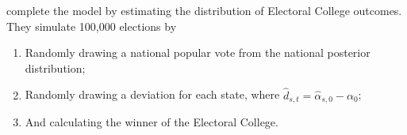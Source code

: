 \documentclass[thesis.tex]{subfiles}
\begin{document}
\begin{comment}
	TODO Should be weighted average on the Var(d_st, d_s0) stuff.
\end{comment}

\cite{Lock:2010aa} complete the model by estimating the distribution of Electoral College outcomes. They simulate 100,000 elections by \begin{enumerate}
	\item Randomly drawing a national popular vote from the national posterior distribution;
	\item Randomly drawing a deviation for each state, where \(\widehat{d}_{s, t} = \widehat{\alpha}_{s, 0} - \alpha_0\);
	\item And calculating the winner of the Electoral College.
\end{enumerate}

\begin{comment}

So, basically, first we look at what \cite{Lock:2010aa} are doing, because it's a nice example for Bayesian inference, and because the approach taken by \cite{Strauss:2007aa} uses Gibbs sampling and gets complicated.

Suppose a poll is centered on the result of an election \(\alpha,\) with some amount of variance \(sigma^2\). Given a prior on the result of the election, which is centered at \(\mu\) with some variance \(v^2\), Bayes' rule tells us that \[
	\alpha | y \sim \N \left[ \left(\frac{\mu}{v^2} + \frac{y}{\sigma^2}\right) \left( \frac{1}{v^2} + \frac{1}{\sigma^2} \right), \left( \frac{1}{v^2} + \frac{1}{\sigma^2} \right) \right].
\]

How do we find out that variance term? Or, how much information does a poll have? (the variance from the election result)

Remember our problems: low reliability earlier in a campaign year, organizational biases.

First we'll talk about low reliability earlier in a campaign year

\end{comment}
\end{document}
